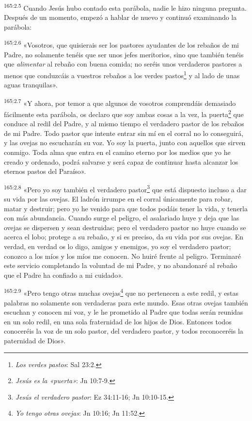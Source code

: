 \par 
\textsuperscript{165:2.5} Cuando Jesús hubo contado esta parábola, nadie le hizo ninguna pregunta. Después de un momento, empezó a hablar de nuevo y continuó examinando la parábola:

\par 
\textsuperscript{165:2.6} «Vosotros, que quisierais ser los pastores ayudantes de los rebaños de mi Padre, no solamente tenéis que ser unos jefes meritorios, sino que también tenéis que \textit{alimentar} al rebaño con buena comida; no seréis unos verdaderos pastores a menos que conduzcáis a vuestros rebaños a los verdes pastos\footnote{\textit{Los verdes pastos}: Sal 23:2.} y al lado de unas aguas tranquilas».

\par 
\textsuperscript{165:2.7} «Y ahora, por temor a que algunos de vosotros comprendáis demasiado fácilmente esta parábola, os declaro que soy ambas cosas a la vez, la puerta\footnote{\textit{Jesús es la «puerta»}: Jn 10:7-9.} que conduce al redil del Padre, y al mismo tiempo el verdadero pastor de los rebaños de mi Padre. Todo pastor que intente entrar sin mí en el corral no lo conseguirá, y las ovejas no escucharán su voz. Yo soy la puerta, junto con aquellos que sirven conmigo. Toda alma que entra en el camino eterno por los medios que yo he creado y ordenado, podrá salvarse y será capaz de continuar hasta alcanzar los eternos pastos del Paraíso».

\par 
\textsuperscript{165:2.8} «Pero yo soy también el verdadero pastor\footnote{\textit{Jesús el verdadero pastor}: Ez 34:11-16; Jn 10:10-15.} que está dispuesto incluso a dar su vida por las ovejas. El ladrón irrumpe en el corral únicamente para robar, matar y destruir; pero yo he venido para que todos podáis tener la vida, y tenerla con más abundancia. Cuando surge el peligro, el asalariado huye y deja que las ovejas se dispersen y sean destruidas; pero el verdadero pastor no huye cuando se acerca el lobo; protege a su rebaño, y si es preciso, da su vida por sus ovejas. En verdad, en verdad os lo digo, amigos y enemigos, yo soy el verdadero pastor; conozco a los míos y los míos me conocen. No huiré frente al peligro. Terminaré este servicio completando la voluntad de mi Padre, y no abandonaré al rebaño que el Padre ha confiado a mi cuidado».

\par 
\textsuperscript{165:2.9} «Pero tengo otras muchas ovejas\footnote{\textit{Yo tengo otras ovejas}: Jn 10:16; Jn 11:52.} que no pertenecen a este redil, y estas palabras no solamente son verdaderas para este mundo. Esas otras ovejas también escuchan y conocen mi voz, y le he prometido al Padre que todas serán reunidas en un solo redil, en una sola fraternidad de los hijos de Dios. Entonces todos conoceréis la voz de un solo pastor, del verdadero pastor, y todos reconoceréis la paternidad de Dios».

